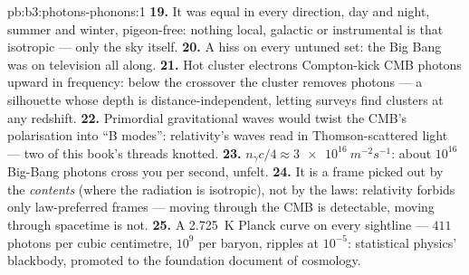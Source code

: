 \begin{solution}{pb:b3:photons-phonons:1}
\textbf{19.} It was equal in every direction, day and night,
summer and winter, pigeon-free: nothing local, galactic or
instrumental is that isotropic --- only the sky itself.
\textbf{20.} A hiss on every untuned set: the Big Bang was on
television all along.
\textbf{21.} Hot cluster electrons Compton-kick CMB photons
upward in frequency: below the crossover the cluster removes
photons --- a silhouette whose depth is distance-independent,
letting surveys find clusters at any redshift.
\textbf{22.} Primordial gravitational waves would twist the
CMB's polarisation into ``B modes'': relativity's waves read in
Thomson-scattered light --- two of this book's threads knotted.
\textbf{23.} $n_\gamma c/4 \approx \qty{3e16}{m^{-2}s^{-1}}$:
about $10^{16}$ Big-Bang photons cross you per second,
unfelt.
\textbf{24.} It is a frame picked out by the \emph{contents}
(where the radiation is isotropic), not by the laws: relativity
forbids only law-preferred frames --- moving through the CMB is
detectable, moving through spacetime is not.
\textbf{25.} A \qty{2.725}{K} Planck curve on every sightline
--- $411$ photons per cubic centimetre, $10^9$ per baryon,
ripples at $10^{-5}$: statistical physics' blackbody, promoted
to the foundation document of cosmology.
\end{solution}
